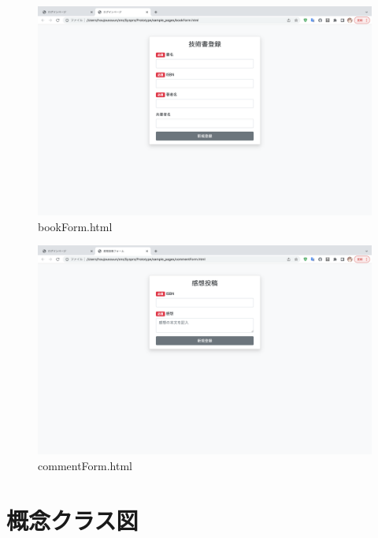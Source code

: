 \documentclass[dvipdfmx]{jsarticle}
\begin{document}
    \begin{figure}[H]
        \begin{center}
            \caption*{bookForm.html}
            \includegraphics[scale=0.3,clip]{pictures/bookForm.png}
        \end{center}
    \end{figure}

    \begin{figure}[H]
        \begin{center}
            \caption*{commentForm.html}
            \includegraphics[scale=0.3,clip]{pictures/commentForm.png}
        \end{center}
    \end{figure}


    \section*{概念クラス図}
\end{document}
